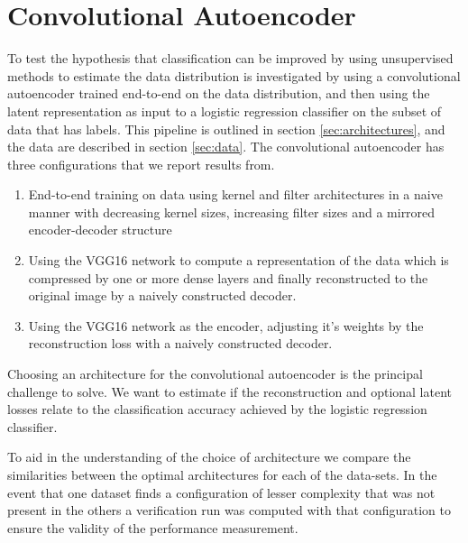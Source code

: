 \section{Convolutional Autoencoder}

To test the hypothesis that classification can be improved by using unsupervised methods to estimate the data distribution is investigated by using a convolutional autoencoder trained end-to-end on the data distribution, and then using the latent representation as input to a logistic regression classifier on the subset of data that has labels. This pipeline is outlined in section \ref{sec:architectures}, and the data are described in section \ref{sec:data}. The convolutional autoencoder has three configurations that we report results from. 
\begin{enumerate}[start=0, label={(\bfseries Ar\arabic*):}, ref={(Ar\arabic*)}]
	\item \label{item:clf_no_vgg} End-to-end training on data using kernel and filter architectures in a naive manner with decreasing kernel sizes, increasing filter sizes and a mirrored encoder-decoder structure
	\item \label{item:clf_freeze_vgg} Using the VGG16 network to compute a representation of the data which is compressed by one or more dense layers and finally reconstructed to the original image by a naively constructed decoder. 
	\item  \label{item:clf_tuning_vgg} Using the VGG16 network as the encoder, adjusting it's weights by the reconstruction loss with a naively constructed decoder. 
\end{enumerate}

\noindent Choosing an architecture for the convolutional autoencoder is the principal challenge to solve. We want to estimate if the reconstruction and optional latent losses relate to the classification accuracy achieved by the logistic regression classifier. 

To aid in the understanding of the choice of architecture we compare the similarities between the optimal architectures for each of the data-sets. In the event that one dataset finds a configuration of lesser complexity that was not present in the others a verification run was computed with that configuration to ensure the validity of the performance measurement. 



